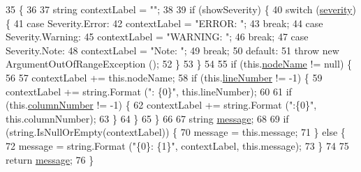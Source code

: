 \begin{DoxyCode}
35         \{
36 
37             \textcolor{keywordtype}{string} contextLabel = \textcolor{stringliteral}{""};
38 
39             \textcolor{keywordflow}{if} (showSeverity) \{
40                 \textcolor{keywordflow}{switch} (\hyperlink{a00069_ad90ffa839ce0f568a099bb37b4a6c4da}{severity}) \{
41                 \textcolor{keywordflow}{case} Severity.Error:
42                     contextLabel = \textcolor{stringliteral}{"ERROR: "};
43                     \textcolor{keywordflow}{break};
44                 \textcolor{keywordflow}{case} Severity.Warning:
45                     contextLabel = \textcolor{stringliteral}{"WARNING: "};
46                     \textcolor{keywordflow}{break};
47                 \textcolor{keywordflow}{case} Severity.Note:
48                     contextLabel = \textcolor{stringliteral}{"Note: "};
49                     \textcolor{keywordflow}{break};
50                 \textcolor{keywordflow}{default}:
51                     \textcolor{keywordflow}{throw} \textcolor{keyword}{new} ArgumentOutOfRangeException ();
52                 \}
53             \}
54 
55             \textcolor{keywordflow}{if} (this.\hyperlink{a00069_a662aca4ad2af5116c2cf6773daf1a847}{nodeName} != null) \{
56 
57                 contextLabel += this.nodeName;
58                 \textcolor{keywordflow}{if} (this.\hyperlink{a00069_a0bd73f1c684bfd66ae7b6bef8f2972d0}{lineNumber} != -1) \{
59                     contextLabel += string.Format (\textcolor{stringliteral}{": \{0\}"}, this.lineNumber);
60 
61                     \textcolor{keywordflow}{if} (this.\hyperlink{a00069_a658e7fb05555c0f9ab5f80057bdc1408}{columnNumber} != -1) \{
62                         contextLabel += string.Format (\textcolor{stringliteral}{":\{0\}"}, this.columnNumber);
63                     \}
64                 \}
65             \} 
66 
67             \textcolor{keywordtype}{string} \hyperlink{a00069_ac7ed070dddd2613c08e7874ea5afb3af}{message};
68 
69             \textcolor{keywordflow}{if} (\textcolor{keywordtype}{string}.IsNullOrEmpty(contextLabel)) \{
70                 message = this.message;
71             \} \textcolor{keywordflow}{else} \{
72                 message = string.Format (\textcolor{stringliteral}{"\{0\}: \{1\}"}, contextLabel, this.message);
73             \}
74 
75             \textcolor{keywordflow}{return} \hyperlink{a00069_ac7ed070dddd2613c08e7874ea5afb3af}{message};
76         \}
\end{DoxyCode}


